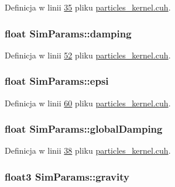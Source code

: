 Definicja w linii \hyperlink{particles__kernel_8cuh_source_l00035}{35} pliku \hyperlink{particles__kernel_8cuh_source}{particles\-\_\-kernel.\-cuh}.

\hypertarget{struct_sim_params_abf1644c671e60ebaf873d9167e755328}{
\subsubsection[{damping}]{\setlength{\rightskip}{0pt plus 5cm}float Sim\-Params\-::damping}}\label{struct_sim_params_abf1644c671e60ebaf873d9167e755328}


Definicja w linii \hyperlink{particles__kernel_8cuh_source_l00052}{52} pliku \hyperlink{particles__kernel_8cuh_source}{particles\-\_\-kernel.\-cuh}.

\hypertarget{struct_sim_params_a760551182a6dff0b67f3048daa2620fb}{
\subsubsection[{epsi}]{\setlength{\rightskip}{0pt plus 5cm}float Sim\-Params\-::epsi}}\label{struct_sim_params_a760551182a6dff0b67f3048daa2620fb}


Definicja w linii \hyperlink{particles__kernel_8cuh_source_l00060}{60} pliku \hyperlink{particles__kernel_8cuh_source}{particles\-\_\-kernel.\-cuh}.

\hypertarget{struct_sim_params_a7058bad8c867d9d42d8c9d842638ebea}{
\subsubsection[{global\-Damping}]{\setlength{\rightskip}{0pt plus 5cm}float Sim\-Params\-::global\-Damping}}\label{struct_sim_params_a7058bad8c867d9d42d8c9d842638ebea}


Definicja w linii \hyperlink{particles__kernel_8cuh_source_l00038}{38} pliku \hyperlink{particles__kernel_8cuh_source}{particles\-\_\-kernel.\-cuh}.

\hypertarget{struct_sim_params_ae7508eba5dd90859215b59d19e001bb9}{
\subsubsection[{gravity}]{\setlength{\rightskip}{0pt plus 5cm}float3 Sim\-Params\-::gravity}}\label{struct_sim_params_ae7508eba5dd90859215b59d19e001bb9}


